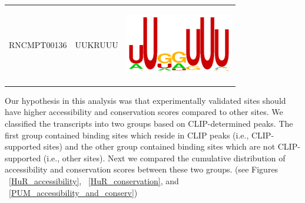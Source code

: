 \begin{table}[H]
{\begin{tabular}{c | c | c}
RNCMPT00136 & UUKRUUU & \begin{center}\includegraphics[scale = 0.25]{ch4_results_discussion/figures/hur_motif/RNCMPT00136.png}\end{center} \\

\end{tabular} %
}
\label{tbl:hur_motifs}
\end{table}

Our hypothesis in this analysis was that experimentally validated sites should have higher accessibility and conservation scores compared to other sites. We classified the transcripts into two groups based on CLIP-determined peaks. The first group contained binding sites which reside in CLIP peaks (i.e., CLIP-supported sites) and the other group contained binding sites which are not CLIP-supported (i.e., other sites). Next we compared the cumulative distribution of accessibility and conservation scores between these two groups. (see Figures ~\ref{HuR_accessibility}, ~\ref{HuR_conservation}, and ~\ref{PUM_accessibility_and_conserv})

